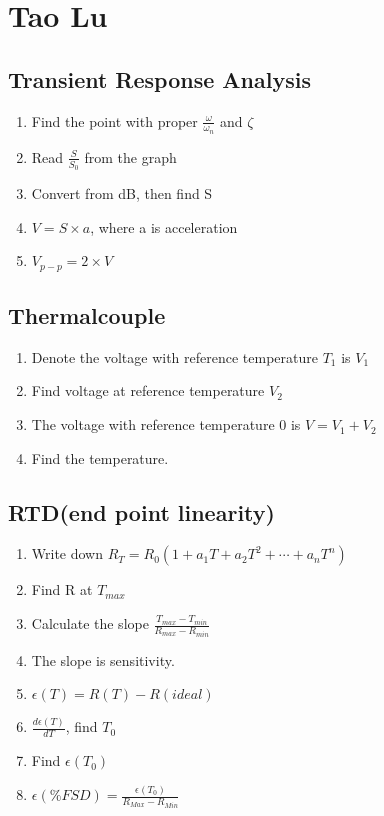 \documentclass{article}
\begin{document}
\section{Tao Lu}
  \subsection{Transient Response Analysis}
  \begin{enumerate}
   \item Find the point with proper $\frac{\omega}{\omega_n}$ and $\zeta$
   \item Read $\frac{S}{S_0}$ from the graph
   \item Convert from dB, then find S
   \item $V = S \times a$, where a is acceleration
   \item $V_{p-p} = 2\times V$
  \end{enumerate}  
  
  \subsection{Thermalcouple}
\begin{enumerate}
\item Denote the voltage with reference temperature $T_1$ is $V_1$
\item Find voltage at reference temperature $V_2$
\item The voltage with reference temperature 0 is $V = V_1 + V_2$
\item Find the temperature.
\end{enumerate}  
  
  \subsection{RTD(end point linearity)}
  \begin{enumerate}
    \item Write down $R_T = R_0(1+a_1T + a_2T^2 + \cdots + a_nT^n)$
    \item Find R at $T_{max}$
    \item Calculate the slope $\frac{T_{max}-T_{min}}{R_{max} - R_{min}}$
    \item The slope is sensitivity.
    \item $\epsilon(T) = R(T) - R(ideal)$
    \item $\frac{d\epsilon (T)}{dT}$, find $T_0$
    \item Find $\epsilon (T_0)$
    \item $\epsilon(\% FSD) = \frac{\epsilon (T_0)}{R_{Max} - R_{Min}}$
  \end{enumerate}
  
\end{document}
